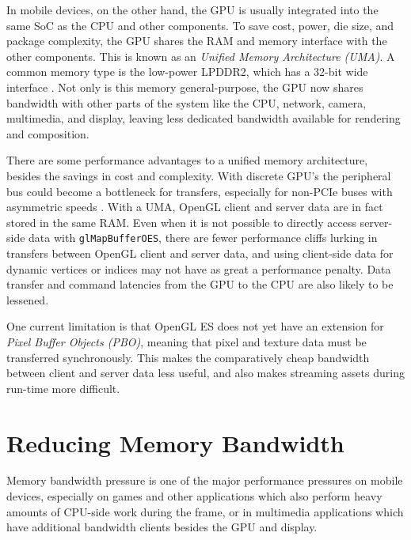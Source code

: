  

In mobile devices, on the other hand, the GPU is usually integrated into the
same SoC as the CPU and other components.  To save cost, power, die size, and
package complexity, the GPU shares the RAM and memory interface with the other
components.  This is known as an \textit{Unified Memory Architecture (UMA)}.  A
common memory type is the low-power LPDDR2, which has a 32-bit wide
interface \cite{Klug11b}.  Not only is this memory general-purpose, the GPU now
shares bandwidth with other parts of the system like the CPU, network, camera,
multimedia, and display, leaving less dedicated bandwidth available for
rendering and composition.


There are some performance advantages to a unified memory architecture, besides
the savings in cost and complexity.  With discrete GPU's the peripheral bus
could become a bottleneck for transfers, especially for non-PCIe buses with
asymmetric speeds \cite{Elhasson05}.  With a UMA, OpenGL client and server data
are in fact stored in the same RAM.  Even when it is not possible to directly
access server-side data with \texttt{glMapBufferOES}, there are fewer
performance cliffs lurking in transfers between OpenGL client and server data,
and using client-side data for dynamic vertices or indices may not have as
great a performance penalty.  Data transfer and command latencies from the GPU to the
CPU are also likely to be lessened.


One current limitation is that OpenGL ES does not yet have an extension for
\textit{Pixel Buffer Objects (PBO)}, meaning that pixel and texture data must
be transferred synchronously.  This makes the comparatively cheap bandwidth
between client and server data less useful, and also makes streaming assets
during run-time more difficult.

\section{Reducing Memory
Bandwidth}\label{Jon-McCaffrey:Reducing-Memory-Bandwidth}


Memory bandwidth pressure is one of the major performance pressures on mobile
devices, especially on games and other applications which also perform heavy
amounts of CPU-side work during the frame, or in multimedia applications which
have additional bandwidth clients besides the GPU and display.

